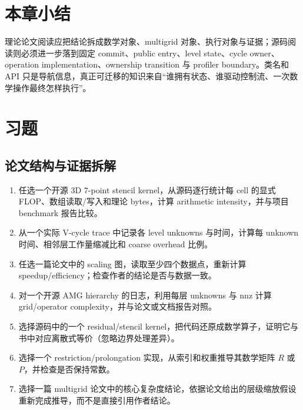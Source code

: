 \section{本章小结}
理论论文阅读应把结论拆成数学对象、multigrid 对象、执行对象与证据；源码阅读则必须进一步落到固定 commit、public entry、level state、cycle owner、operation implementation、ownership transition 与 profiler boundary。类名和 API 只是导航信息，真正可迁移的知识来自“谁拥有状态、谁驱动控制流、一次数学操作最终怎样执行”。

\section*{习题}

\subsection*{论文结构与证据拆解}
\begin{enumerate}[label=\arabic*.]
\item 任选一个开源 3D 7-point stencil kernel，从源码逐行统计每 cell 的显式 FLOP、数组读取/写入和理论 bytes，计算 arithmetic intensity，并与项目 benchmark 报告比较。
\item 从一个实际 V-cycle trace 中记录各 level unknowns 与时间，计算每 unknown 时间、相邻层工作量缩减比和 coarse overhead 比例。
\item 任选一篇论文中的 scaling 图，读取至少四个数据点，重新计算 speedup/efficiency；检查作者的结论是否与数据一致。
\item 对一个开源 AMG hierarchy 的日志，利用每层 unknowns 与 nnz 计算 grid/operator complexity，并与论文或文档报告对照。

\item 选择源码中的一个 residual/stencil kernel，把代码还原成数学算子，证明它与书中对应离散式等价（忽略边界处理差异）。
\item 选择一个 restriction/prolongation 实现，从索引和权重推导其数学矩阵 $R$ 或 $P$，并检查是否保持常数。
\item 选择一篇 multigrid 论文中的核心复杂度结论，依据论文给出的层级缩放假设重新完成推导，而不是直接引用作者结论。
\end{enumerate}


